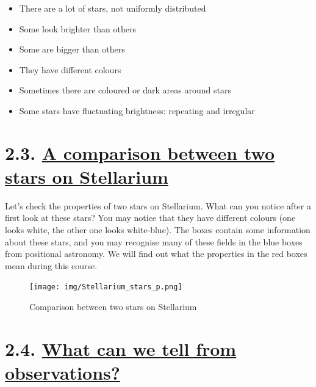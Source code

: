 \documentclass[
  letterpaper,
  DIV=11,
  numbers=noendperiod]{scrreprt}
\providecommand{\tightlist}{%
  \setlength{\itemsep}{0pt}\setlength{\parskip}{0pt}}\usepackage{longtable,booktabs,array}
\begin{document}

\begin{itemize}
\tightlist
\item
  There are a lot of stars, not uniformly distributed
\item
  Some look brighter than others
\item
  Some are bigger than others
\item
  They have different colours
\item
  Sometimes there are coloured or dark areas around stars
\item
  Some stars have fluctuating brightness: repeating and irregular
\end{itemize}

\hypertarget{a-comparison-between-two-stars-on-stellarium-1}{%
\section*{\texorpdfstring{2.3. \protect\hyperlink{toc0_}{A comparison
between two stars on
Stellarium}}{2.3. A comparison between two stars on Stellarium}}\label{a-comparison-between-two-stars-on-stellarium-1}}


Let's check the properties of two stars on Stellarium. What can you
notice after a first look at these stars? You may notice that they have
different colours (one looks white, the other one looks white-blue). The
boxes contain some information about these stars, and you may recognise
many of these fields in the blue boxes from positional astronomy. We
will find out what the properties in the red boxes mean during this
course.

\begin{figure}

{\centering \texttt{[image: img/Stellarium\_stars\_p.png]}

}

\caption{Comparison between two stars on Stellarium}

\end{figure}

\hypertarget{what-can-we-tell-from-observations-1}{%
\section*{\texorpdfstring{2.4. \protect\hyperlink{toc0_}{What can we
tell from
observations?}}{2.4. What can we tell from observations?}}\label{what-can-we-tell-from-observations-1}}
\end{document}
